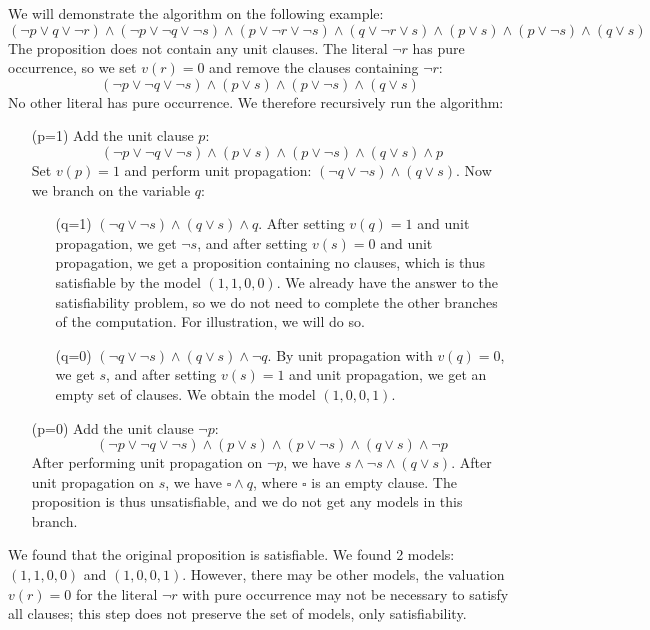 \begin{example}
    We will demonstrate the algorithm on the following example:
    $$
    (\neg p\lor q\lor \neg r)\land(\neg p\lor\neg q\lor\neg s)\land(p\lor \neg r\lor \neg s)\land(q\lor \neg r\lor s)\land (p\lor s)\land(p\lor\neg s)\land(q\lor s)
    $$
    The proposition does not contain any unit clauses. The literal $\neg r$ has pure occurrence, so we set $v(r)=0$ and remove the clauses containing $\neg r$:
    $$
    (\neg p\lor\neg q\lor\neg s)\land (p\lor s)\land(p\lor\neg s)\land(q\lor s)
    $$
    No other literal has pure occurrence. We therefore recursively run the algorithm:
    \begin{itemize}
        \item[(p=1)] Add the unit clause $p$:
        $$
        (\neg p\lor\neg q\lor\neg s)\land (p\lor s)\land(p\lor\neg s)\land(q\lor s)\land p
        $$
        Set $v(p)=1$ and perform unit propagation: $(\neg q\lor\neg s)\land(q\lor s)$. Now we branch on the variable $q$:
        \begin{itemize}
            \item[(q=1)] $(\neg q\lor\neg s)\land(q\lor s)\land q$. After setting $v(q)=1$ and unit propagation, we get $\neg s$, and after setting $v(s)=0$ and unit propagation, we get a proposition containing no clauses, which is thus satisfiable by the model $(1,1,0,0)$. We already have the answer to the satisfiability problem, so we do not need to complete the other branches of the computation. For illustration, we will do so.
            \item[(q=0)] $(\neg q\lor\neg s)\land(q\lor s)\land \neg q$. By unit propagation with $v(q)=0$, we get $s$, and after setting $v(s)=1$ and unit propagation, we get an empty set of clauses. We obtain the model $(1,0,0,1)$.
        \end{itemize}
        \item[(p=0)] Add the unit clause $\neg p$:
        $$
        (\neg p\lor\neg q\lor\neg s)\land (p\lor s)\land(p\lor\neg s)\land(q\lor s)\land \neg p
        $$
        After performing unit propagation on $\neg p$, we have $s\land \neg s\land(q\lor s)$. After unit propagation on $s$, we have $\square\land q$, where $\square$ is an empty clause. The proposition is thus unsatisfiable, and we do not get any models in this branch. 
    \end{itemize}

We found that the original proposition is satisfiable. We found 2 models: $(1,1,0,0)$ and $(1,0,0,1)$. However, there may be other models, the valuation $v(r)=0$ for the literal $\neg r$ with pure occurrence may not be necessary to satisfy all clauses; this step does not preserve the set of models, only satisfiability.
\end{example}

